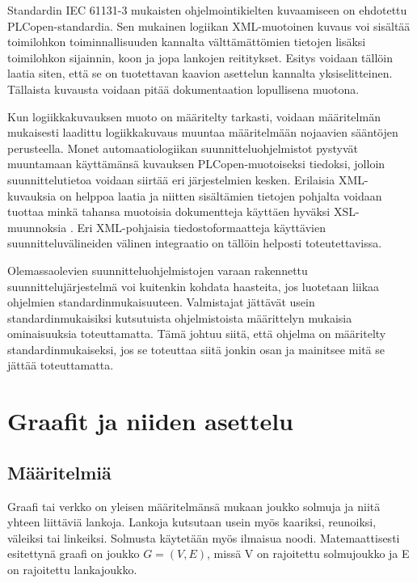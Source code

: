 \documentclass[finnish,12pt]{article}
\begin{document}
Standardin IEC 61131-3 mukaisten ohjelmointikielten kuvaamiseen on ehdotettu PLCopen-standardia.
Sen mukainen logiikan XML-muotoinen kuvaus voi sisältää toimilohkon toiminnallisuuden kannalta välttämättömien tietojen lisäksi toimilohkon sijainnin, koon ja jopa lankojen reititykset.
Esitys voidaan tällöin laatia siten, että se on tuotettavan kaavion asettelun kannalta yksiselitteinen.
Tällaista kuvausta voidaan pitää dokumentaation lopullisena muotona. \cite{RefWorks:64}

Kun logiikkakuvauksen muoto on määritelty tarkasti, voidaan määritelmän mukaisesti laadittu logiikkakuvaus muuntaa määritelmään nojaavien sääntöjen perusteella.
Monet automaatiologiikan suunnitteluohjelmistot pystyvät muuntamaan käyttämänsä kuvauksen PLCopen-muotoiseksi tiedoksi, jolloin suunnittelutietoa voidaan siirtää eri järjestelmien kesken.
Erilaisia XML-kuvauksia on helppoa laatia ja niitten sisältämien tietojen pohjalta voidaan tuottaa minkä tahansa muotoisia dokumentteja käyttäen hyväksi XSL-muunnoksia \cite{RefWorks:61}. Eri XML-pohjaisia tiedostoformaatteja käyttävien suunnitteluvälineiden välinen integraatio on tällöin helposti toteutettavissa.

Olemassaolevien suunnitteluohjelmistojen varaan rakennettu suunnittelujärjestelmä voi kuitenkin kohdata haasteita, jos luotetaan liikaa ohjelmien standardinmukaisuuteen.
Valmistajat jättävät usein standardinmukaisiksi kutsutuista ohjelmistoista määrittelyn mukaisia ominaisuuksia toteuttamatta.
Tämä johtuu siitä, että ohjelma on määritelty standardinmukaiseksi, jos se toteuttaa siitä jonkin osan ja mainitsee mitä se jättää toteuttamatta. \cite{RefWorks:42}


	\clearpage
		
	\section{Graafit ja niiden asettelu}

	\subsection{Määritelmiä}

Graafi tai verkko on yleisen määritelmänsä mukaan joukko solmuja ja niitä yhteen liittäviä lankoja.
Lankoja kutsutaan usein myös kaariksi, reunoiksi, väleiksi tai linkeiksi. Solmusta käytetään myös ilmaisua noodi.
Matemaattisesti esitettynä graafi on joukko $G = (V, E)$, missä V on rajoitettu solmujoukko ja E on rajoitettu lankajoukko.
\end{document}
